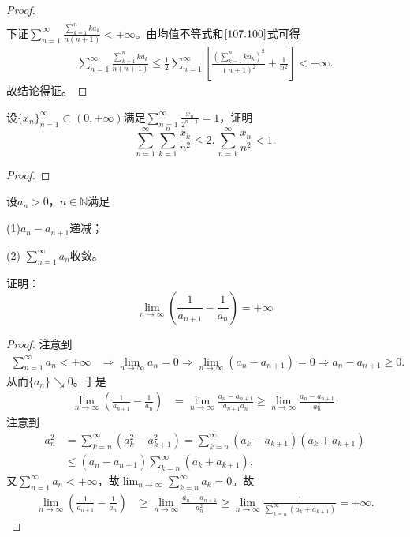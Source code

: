 \documentclass[../../main.tex]{subfiles}
\begin{document}
\begin{proof}
\begin{align*}
\end{align*}
下证\(\sum_{n=1}^{\infty}{\frac{\sum\limits_{k=1}^n{ka_k}}{n\left( n+1 \right)}}<+\infty\)。由均值不等式和\(\eqref{107.100}\)式可得
\begin{align*}
\sum_{n=1}^{\infty}{\frac{\sum\limits_{k=1}^n{ka_k}}{n\left( n+1 \right)}}\leqslant \frac{1}{2}\sum_{n=1}^{\infty}{\left[ \frac{\left( \sum\limits_{k=1}^n{ka_k} \right) ^2}{\left( n+1 \right) ^2}+\frac{1}{n^2} \right]}<+\infty .
\end{align*}
故结论得证。

\end{proof}

\begin{example}
设$\{x_n\}_{n = 1}^{\infty} \subset (0,+\infty)$满足$\sum_{n = 1}^{\infty} \frac{x_n}{2^{n - 1}} = 1$，证明
\[
\sum_{n = 1}^{\infty} \sum_{k = 1}^n \frac{x_k}{n^2} \leqslant 2, \sum_{n = 1}^{\infty} \frac{x_n}{n^2} < 1.
\]
\end{example}
\begin{proof}


\end{proof}

\begin{example}
设$a_n > 0$，$n \in \mathbb{N}$满足

(1)$a_n - a_{n + 1}$递减；

(2) $\sum_{n = 1}^{\infty} a_n$收敛。

证明：
\[
\lim_{n \to \infty} \left( \frac{1}{a_{n + 1}} - \frac{1}{a_n} \right) = +\infty
\]
\end{example}
\begin{proof}
注意到
\begin{align*}
\sum_{n=1}^{\infty}{a_n}<+\infty &\Longrightarrow \lim_{n\rightarrow \infty}a_n=0\Longrightarrow \lim_{n\rightarrow \infty}\left( a_n-a_{n+1} \right) =0\Longrightarrow a_n-a_{n+1}\geqslant 0.
\end{align*}
从而$\{ a_n \} \searrow 0$。于是
\begin{align*}
\lim_{n\rightarrow \infty}\left( \frac{1}{a_{n+1}}-\frac{1}{a_n} \right) &=\lim_{n\rightarrow \infty}\frac{a_n-a_{n+1}}{a_{n+1}a_n}\geqslant \lim_{n\rightarrow \infty}\frac{a_n-a_{n+1}}{a_{n}^{2}}.
\end{align*}
注意到
\begin{align*}
a_{n}^{2}&=\sum_{k=n}^{\infty}{\left( a_{k}^{2}-a_{k+1}^{2} \right)}=\sum_{k=n}^{\infty}{\left( a_k-a_{k+1} \right) \left( a_k+a_{k+1} \right)} \\
&\leqslant \left( a_n-a_{n+1} \right) \sum_{k=n}^{\infty}{\left( a_k+a_{k+1} \right)},
\end{align*}
又$\sum_{n=1}^{\infty}{a_n}<+\infty$，故$\lim_{n\rightarrow \infty}\sum_{k=n}^{\infty}{a_k}=0$。故
\begin{align*}
\lim_{n\rightarrow \infty}\left( \frac{1}{a_{n+1}}-\frac{1}{a_n} \right) &\geqslant \lim_{n\rightarrow \infty}\frac{a_n-a_{n+1}}{a_{n}^{2}}\geqslant \lim_{n\rightarrow \infty}\frac{1}{\sum\limits_{k=n}^{\infty}{\left( a_k+a_{k+1} \right)}}=+\infty .
\end{align*}

\end{proof}
\end{document}
